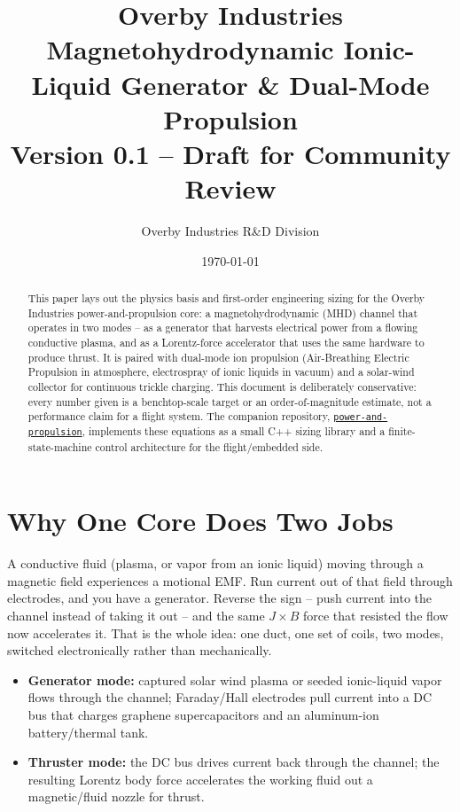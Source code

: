 \documentclass[12pt]{article}
\title{
    \Huge \textbf{Overby Industries} \\[0.5em]
    \Large Magnetohydrodynamic Ionic-Liquid Generator \& Dual-Mode Propulsion \\[1em]
    {\large Version 0.1 -- Draft for Community Review}
}
\author{Overby Industries R\&D Division}
\date{\today}
\begin{document}
\maketitle
\thispagestyle{empty}

\begin{abstract}
This paper lays out the physics basis and first-order engineering sizing for the Overby Industries power-and-propulsion core: a magnetohydrodynamic (MHD) channel that operates in two modes -- as a generator that harvests electrical power from a flowing conductive plasma, and as a Lorentz-force accelerator that uses the same hardware to produce thrust. It is paired with dual-mode ion propulsion (Air-Breathing Electric Propulsion in atmosphere, electrospray of ionic liquids in vacuum) and a solar-wind collector for continuous trickle charging. This document is deliberately conservative: every number given is a benchtop-scale target or an order-of-magnitude estimate, not a performance claim for a flight system. The companion repository, \href{https://github.com/Overby-Industries/power-and-propulsion}{\texttt{power-and-propulsion}}, implements these equations as a small C++ sizing library and a finite-state-machine control architecture for the flight/embedded side.
\end{abstract}

\newpage
\tableofcontents
\newpage

\section{Why One Core Does Two Jobs}
A conductive fluid (plasma, or vapor from an ionic liquid) moving through a magnetic field experiences a motional EMF. Run current out of that field through electrodes, and you have a generator. Reverse the sign -- push current into the channel instead of taking it out -- and the same $J \times B$ force that resisted the flow now accelerates it. That is the whole idea: one duct, one set of coils, two modes, switched electronically rather than mechanically.

\begin{itemize}
    \item \textbf{Generator mode:} captured solar wind plasma or seeded ionic-liquid vapor flows through the channel; Faraday/Hall electrodes pull current into a DC bus that charges graphene supercapacitors and an aluminum-ion battery/thermal tank.
    \item \textbf{Thruster mode:} the DC bus drives current back through the channel; the resulting Lorentz body force accelerates the working fluid out a magnetic/fluid nozzle for thrust.
\end{itemize}
\end{document}
